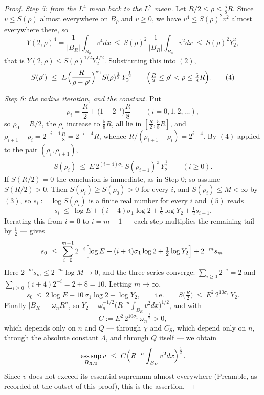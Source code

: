 \begin{proof}
\emph{Step 5: from the $L^4$ mean back to the $L^2$ mean.}  Let
$R/2\le\rho\le\frac58R$.  Since $v\le S(\rho)$ almost everywhere on $B_\rho$ and
$v\ge0$, we have $v^4\le S(\rho)^2v^2$ almost everywhere there, so
\[
Y(2,\rho)^4=\frac1{|B_R|}\int_{B_\rho}v^4dx
\ \le\ S(\rho)^2\,\frac1{|B_R|}\int_{B_\rho}v^2dx
\ \le\ S(\rho)^2Y_2^2 ,
\]
that is $Y(2,\rho)\le S(\rho)^{1/2}Y_2^{1/2}$.  Substituting this into $(2)$,
\[
S(\rho')\ \le\ E\Bigl(\frac R{\rho-\rho'}\Bigr)^{\sigma_1}
S(\rho)^{\frac12}\,Y_2^{\frac12}
\qquad\Bigl(\tfrac R2\le\rho'<\rho\le\tfrac58R\Bigr).
\tag{4}
\]

\emph{Step 6: the radius iteration, and the constant.}  Put
\[
\rho_i=\frac R2+\bigl(1-2^{-i}\bigr)\frac R8\qquad(i=0,1,2,\dots),
\]
so $\rho_0=R/2$, the $\rho_i$ increase to $\frac58R$, all lie in
$[\frac R2,\frac58R]$, and
$\rho_{i+1}-\rho_i=2^{-i-1}\frac R8=2^{-i-4}R$, whence
$R/(\rho_{i+1}-\rho_i)=2^{i+4}$.  By $(4)$ applied to the pair
$(\rho_i,\rho_{i+1})$,
\[
S(\rho_i)\ \le\ E\,2^{(i+4)\sigma_1}\,S(\rho_{i+1})^{\frac12}\,Y_2^{\frac12}
\qquad(i\ge0).
\tag{5}
\]
If $S(R/2)=0$ the conclusion is immediate, as in Step 0; so assume
$S(R/2)>0$.  Then $S(\rho_i)\ge S(\rho_0)>0$ for every $i$, and
$S(\rho_i)\le M<\infty$ by $(3)$, so $s_i:=\log S(\rho_i)$ is a finite real
number for every $i$ and $(5)$ reads
\[
s_i\ \le\ \log E+(i+4)\sigma_1\log2+\tfrac12\log Y_2+\tfrac12s_{i+1}.
\]
Iterating this from $i=0$ to $i=m-1$ --- each step multiplies the remaining tail
by $\tfrac12$ --- gives
\[
s_0\ \le\ \sum_{i=0}^{m-1}2^{-i}\Bigl[\log E+(i+4)\sigma_1\log2+\tfrac12\log Y_2\Bigr]
+2^{-m}s_m .
\]
Here $2^{-m}s_m\le2^{-m}\log M\to0$, and the three series converge:
$\sum_{i\ge0}2^{-i}=2$ and $\sum_{i\ge0}(i+4)2^{-i}=2+8=10$.  Letting
$m\to\infty$,
\[
s_0\ \le\ 2\log E+10\,\sigma_1\log2+\log Y_2 ,
\qquad\text{i.e.}\qquad
S\bigl(\tfrac R2\bigr)\ \le\ E^2\,2^{10\sigma_1}\,Y_2 .
\]
Finally $|B_R|=\omega_nR^n$, so
$Y_2=\omega_n^{-1/2}\bigl(R^{-n}\int_{B_R}v^2dx\bigr)^{1/2}$, and with
\[
C:=E^2\,2^{10\sigma_1}\,\omega_n^{-\frac12}>0 ,
\]
which depends only on $n$ and $Q$ --- through $\chi$ and $C_S$, which depend only
on $n$, through the absolute constant $\Lambda$, and through $Q$ itself ---
we obtain
\[
\operatorname*{ess\,sup}_{B_{R/2}}v\ \le\ C\Bigl(R^{-n}\int_{B_R}v^2dx\Bigr)^{\frac12}.
\]
Since $v$ does not exceed its essential supremum almost everywhere (Preamble,
as recorded at the outset of this proof), this is the assertion.
\end{proof}
